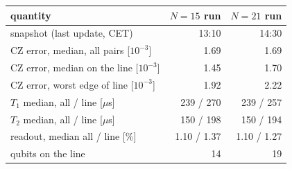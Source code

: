 \begin{tabular}{lrr}
\toprule
quantity & $N=15$ run & $N=21$ run \\
\midrule
snapshot (last update, CET) & 13:10 & 14:30 \\
CZ error, median, all pairs [$10^{-3}$] & 1.69 & 1.69 \\
CZ error, median on the line [$10^{-3}$] & 1.45 & 1.70 \\
CZ error, worst edge of line [$10^{-3}$] & 1.92 & 2.22 \\
$T_1$ median, all / line [$\mu$s] & 239 / 270 & 239 / 257 \\
$T_2$ median, all / line [$\mu$s] & 150 / 198 & 150 / 194 \\
readout, median all / line [\%] & 1.10 / 1.37 & 1.10 / 1.27 \\
qubits on the line & 14 & 19 \\
\bottomrule
\end{tabular}
